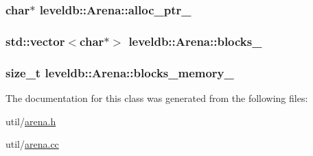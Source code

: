 \subsubsection[{alloc\+\_\+ptr\+\_\+}]{\setlength{\rightskip}{0pt plus 5cm}char$\ast$ leveldb\+::\+Arena\+::alloc\+\_\+ptr\+\_\+\hspace{0.3cm}{\ttfamily [private]}}\label{classleveldb_1_1_arena_ac2fcfb7ce7f511f431ac5c900bacb16c}
\hypertarget{classleveldb_1_1_arena_a7b1488a669cd4d8e7ef6dfa04cc0e267}{}
\subsubsection[{blocks\+\_\+}]{\setlength{\rightskip}{0pt plus 5cm}std\+::vector$<$char$\ast$$>$ leveldb\+::\+Arena\+::blocks\+\_\+\hspace{0.3cm}{\ttfamily [private]}}\label{classleveldb_1_1_arena_a7b1488a669cd4d8e7ef6dfa04cc0e267}
\hypertarget{classleveldb_1_1_arena_a9f79fd19ba98968cd89bbd9097848f22}{}
\subsubsection[{blocks\+\_\+memory\+\_\+}]{\setlength{\rightskip}{0pt plus 5cm}size\+\_\+t leveldb\+::\+Arena\+::blocks\+\_\+memory\+\_\+\hspace{0.3cm}{\ttfamily [private]}}\label{classleveldb_1_1_arena_a9f79fd19ba98968cd89bbd9097848f22}


The documentation for this class was generated from the following files\+:\begin{DoxyCompactItemize}
\item 
util/\hyperlink{arena_8h}{arena.\+h}\item 
util/\hyperlink{arena_8cc}{arena.\+cc}\end{DoxyCompactItemize}
